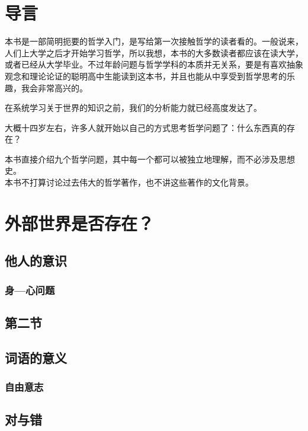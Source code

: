 \documentclass[UTF8]{ctexart} %
\begin{document}
	
	\tableofcontents %

	\newpage %
	
	\section{导言}
	本书是一部简明扼要的哲学入门，是写给第一次接触哲学的读者看的。一般说来，人们上大学之后才开始学习哲学，所以我想，本书的大多数读者都应该在读大学，或者已经从大学毕业。不过年龄问题与哲学学科的本质并无关系，要是有喜欢抽象观念和理论论证的聪明高中生能读到这本书，并且也能从中享受到哲学思考的乐趣，我会非常高兴的。
	
	在系统学习关于世界的知识之前，我们的分析能力就已经高度发达了。\par 大概十四岁左右，许多人就开始以自己的方式思考哲学问题了：什么东西真的存在？
	
	本书直接介绍九个哲学问题，其中每一个都可以被独立地理解，而不必涉及思想史。\\本书不打算讨论过去伟大的哲学著作，也不讲这些著作的文化背景。
	
	\section{外部世界是否存在？}
	\subsection{他人的意识}
	\subsubsection{身—心问题} %
	\subsection{第二节}
	\subsection{词语的意义}
	\subsubsection{自由意志}
	\subsection{对与错}
	
\end{document}
